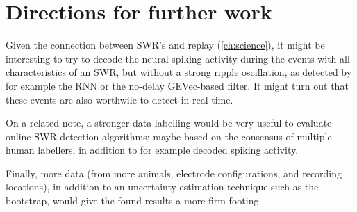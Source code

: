 \section{Directions for further work}

Given the connection between SWR's and replay (\cref{ch:science}), it might be interesting to try to decode the neural spiking activity during the events with all characteristics of an SWR, but without a strong ripple oscillation, as detected by for example the RNN or the no-delay GEVec-based filter. It might turn out that these events are also worthwile to detect in real-time.

On a related note, a stronger data labelling would be very useful to evaluate online SWR detection algorithms; maybe based on the consensus of multiple human labellers, in addition to for example decoded spiking activity.

Finally, more data (from more animals, electrode configurations, and recording locations), in addition to an uncertainty estimation technique such as the bootstrap, would give the found results a more firm footing.
